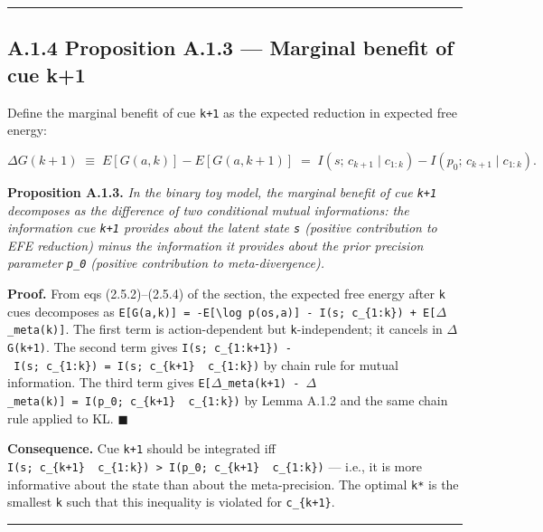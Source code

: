 \documentclass{article}
\begin{document}
\begin{center}\rule{0.5\linewidth}{0.5pt}\end{center}

\subsection{A.1.4 Proposition A.1.3 --- Marginal benefit of cue
k+1}\label{a.1.4-proposition-a.1.3-marginal-benefit-of-cue-k1}

Define the marginal benefit of cue \texttt{k+1} as the expected
reduction in expected free energy:

\[
\Delta G(k+1) \;\equiv\; E[G(a, k)] - E[G(a, k+1)] \;=\; I(s;\, c_{k+1} \mid c_{1:k}) - I(p_0;\, c_{k+1} \mid c_{1:k}).
\]

\textbf{Proposition A.1.3.} \emph{In the binary toy model, the marginal
benefit of cue \texttt{k+1} decomposes as the difference of two
conditional mutual informations: the information cue \texttt{k+1}
provides about the latent state \texttt{s} (positive contribution to EFE
reduction) minus the information it provides about the prior precision
parameter \texttt{p\_0} (positive contribution to meta-divergence).}

\textbf{Proof.} From eqs (2.5.2)--(2.5.4) of the section, the expected
free energy after \texttt{k} cues decomposes as
\texttt{E{[}G(a,k){]}\ =\ -E{[}\textbackslash{}log\ p(o\textbar{}s,a){]}\ -\ I(s;\ c\_\{1:k\})\ +\ E{[}\ensuremath{\Delta}\_meta(k){]}}.
The first term is action-dependent but \texttt{k}-independent; it
cancels in \texttt{\ensuremath{\Delta}G(k+1)}. The second term gives
\texttt{I(s;\ c\_\{1:k+1\})\ -\ I(s;\ c\_\{1:k\})\ =\ I(s;\ c\_\{k+1\}\ \textbar{}\ c\_\{1:k\})}
by chain rule for mutual information. The third term gives
\texttt{E{[}\ensuremath{\Delta}\_meta(k+1)\ -\ \ensuremath{\Delta}\_meta(k){]}\ =\ I(p\_0;\ c\_\{k+1\}\ \textbar{}\ c\_\{1:k\})}
by Lemma A.1.2 and the same chain rule applied to KL. \ensuremath{\blacksquare}

\textbf{Consequence.} Cue \texttt{k+1} should be integrated iff
\texttt{I(s;\ c\_\{k+1\}\ \textbar{}\ c\_\{1:k\})\ \textgreater{}\ I(p\_0;\ c\_\{k+1\}\ \textbar{}\ c\_\{1:k\})}
--- i.e., it is more informative about the state than about the
meta-precision. The optimal \texttt{k*} is the smallest \texttt{k} such
that this inequality is violated for \texttt{c\_\{k+1\}}.

\begin{center}\rule{0.5\linewidth}{0.5pt}\end{center}
\end{document}
